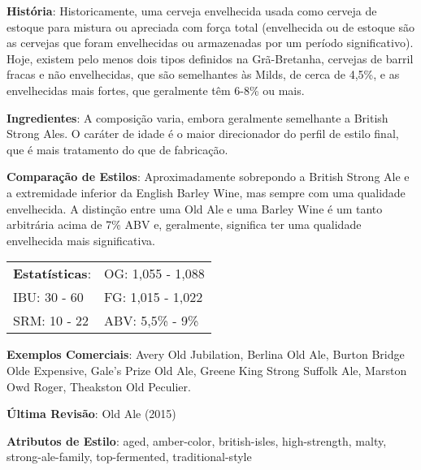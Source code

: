 \textbf{História}: Historicamente, uma cerveja envelhecida usada como cerveja de estoque para mistura ou apreciada com força total (envelhecida ou de estoque são as cervejas que foram envelhecidas ou armazenadas por um período significativo). Hoje, existem pelo menos dois tipos definidos na Grã-Bretanha, cervejas de barril fracas e não envelhecidas, que são semelhantes às Milds, de cerca de 4,5\%, e as envelhecidas mais fortes, que geralmente têm 6-8\% ou mais.

\textbf{Ingredientes}: A composição varia, embora geralmente semelhante a British Strong Ales. O caráter de idade é o maior direcionador do perfil de estilo final, que é mais tratamento do que de fabricação.

\textbf{Comparação de Estilos}: Aproximadamente sobrepondo a British Strong Ale e a extremidade inferior da English Barley Wine, mas sempre com uma qualidade envelhecida. A distinção entre uma Old Ale e uma Barley Wine é um tanto arbitrária acima de 7\% ABV e, geralmente, significa ter uma qualidade envelhecida mais significativa.

\begin{tabular}{@{}p{35mm}p{35mm}@{}}
  \textbf{Estatísticas}: & OG: 1,055 - 1,088 \\
  IBU: 30 - 60  & FG: 1,015 - 1,022  \\
  SRM: 10 - 22  & ABV: 5,5\% - 9\%
\end{tabular}

\textbf{Exemplos Comerciais}: Avery Old Jubilation, Berlina Old Ale, Burton Bridge Olde Expensive, Gale’s Prize Old Ale, Greene King Strong Suffolk Ale, Marston Owd Roger, Theakston Old Peculier.

\textbf{Última Revisão}: Old Ale (2015)

\textbf{Atributos de Estilo}: aged, amber-color, british-isles, high-strength, malty, strong-ale-family, top-fermented, traditional-style
